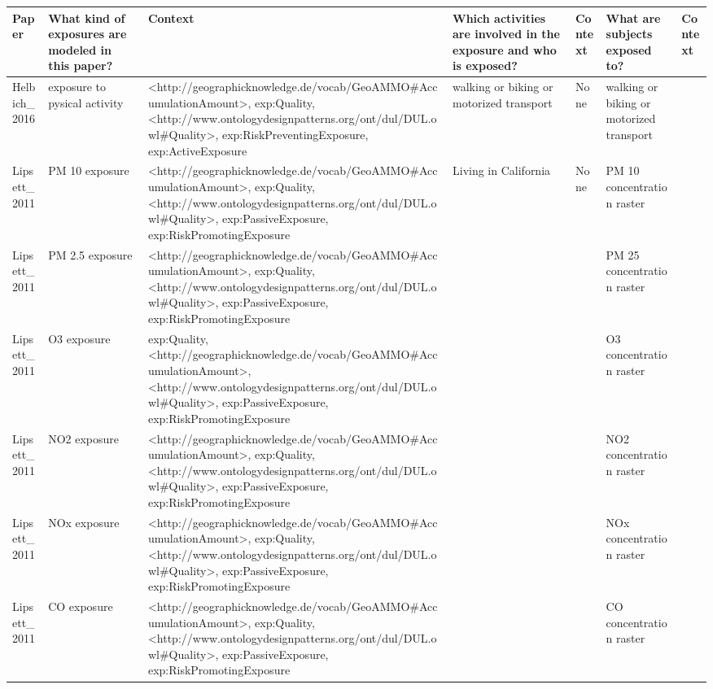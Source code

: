 \begin{tabular}{p{1cm}p{1cm}p{1cm}p{1cm}p{1cm}p{1cm}p{1cm}}
\toprule
          Paper & What kind of exposures are modeled in this paper? &                                                                                                                                                                                                                        Context & Which activities are involved in the exposure and who is exposed? &                    Context &                     What are subjects exposed to? & Context \\
\midrule
Helbich\_2016 & exposure to pysical activity & <http://geographicknowledge.de/vocab/GeoAMMO\#AccumulationAmount>, exp:Quality, <http://www.ontologydesignpatterns.org/ont/dul/DUL.owl\#Quality>, exp:RiskPreventingExposure, exp:ActiveExposure & walking or biking or motorized transport & None & walking or biking or motorized transport &  \\
Lipsett\_2011 & PM 10 exposure & <http://geographicknowledge.de/vocab/GeoAMMO\#AccumulationAmount>, exp:Quality, <http://www.ontologydesignpatterns.org/ont/dul/DUL.owl\#Quality>, exp:PassiveExposure, exp:RiskPromotingExposure & Living in California & None & PM 10 concentration raster &  \\
Lipsett\_2011 & PM 2.5 exposure & <http://geographicknowledge.de/vocab/GeoAMMO\#AccumulationAmount>, exp:Quality, <http://www.ontologydesignpatterns.org/ont/dul/DUL.owl\#Quality>, exp:PassiveExposure, exp:RiskPromotingExposure &  &  & PM 25 concentration raster &  \\
Lipsett\_2011 & O3 exposure & exp:Quality, <http://geographicknowledge.de/vocab/GeoAMMO\#AccumulationAmount>, <http://www.ontologydesignpatterns.org/ont/dul/DUL.owl\#Quality>, exp:PassiveExposure, exp:RiskPromotingExposure &  &  & O3 concentration raster &  \\
Lipsett\_2011 & NO2 exposure & <http://geographicknowledge.de/vocab/GeoAMMO\#AccumulationAmount>, exp:Quality, <http://www.ontologydesignpatterns.org/ont/dul/DUL.owl\#Quality>, exp:PassiveExposure, exp:RiskPromotingExposure &  &  & NO2 concentration raster &  \\
Lipsett\_2011 & NOx exposure & <http://geographicknowledge.de/vocab/GeoAMMO\#AccumulationAmount>, exp:Quality, <http://www.ontologydesignpatterns.org/ont/dul/DUL.owl\#Quality>, exp:PassiveExposure, exp:RiskPromotingExposure &  &  & NOx concentration raster &  \\
Lipsett\_2011 & CO exposure & <http://geographicknowledge.de/vocab/GeoAMMO\#AccumulationAmount>, exp:Quality, <http://www.ontologydesignpatterns.org/ont/dul/DUL.owl\#Quality>, exp:PassiveExposure, exp:RiskPromotingExposure &  &  & CO concentration raster &  \\

\end{tabular}

